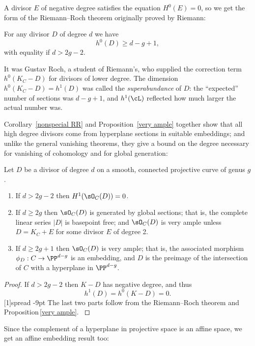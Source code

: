 A divisor $E$
of negative degree 
satisfies the equation
$H^0(E) = 0$,
so we get the form of the Riemann--Roch theorem
originally proved by 
Riemann:
%

\begin{corollary}\label{nonspecial RR}
For any divisor $D$ of degree $d$ we have
$$
h^0(D) \geq d - g + 1,
$$
with equality if $d > 2g-2$.
\end{corollary}
%
It was 
Gustav Roch,
%
a student of
Riemann's, 
who supplied the correction term $h^0(K_C - D)$ for divisors of lower degree.
The dimension $h^0(K_C-D) = h^1(D)$ was called the 
\emph{superabundance}
%
of $D$: the ``expected'' number of sections was $d-g+1$, and $h^1(\cL)$ reflected how much larger the actual number was.

Corollary~\ref{nonspecial RR} and Proposition~\ref{very ample} together show that all high degree divisors come from hyperplane sections in 
suitable embeddings; and unlike the general vanishing theorems, they give a bound on the degree necessary for vanishing
of cohomology and for
global generation:

\begin{corollary}\label{degree 2g+1 embedding}
Let $D$ be a divisor of degree $d$ on a smooth, connected projective curve of genus $g$.
\begin{enumerate}
 \item If $d>2g-2$ then $H^1(\sO_C(D)) = 0$.
 \item If $d \geq 2g$ then $\sO_C(D)$ is generated by global sections; that is, the complete linear series $|D|$ is basepoint free; and $\sO_C(D)$ is very ample unless $D = K_{C}+E$ for some divisor $E$ of degree 2.
 \item If $d \geq 2g+1$ then $\sO_C(D)$ is very ample; that is, the associated morphism $\phi_D : C \to \PP^{d-g}$ is an embedding, and
$D$ is the preimage of the intersection of $C$ with a hyperplane in $ \PP^{d-g}$.
\end{enumerate}
\end{corollary}

\begin{proof}
If $d>2g-2$ then $K-D$ has negative degree, and thus 
$$h^1(D) = h^0(K-D) = 0. $$ 
\scalebox{0.99}[1]{\hbox spread -9pt{%
The last two parts follow
from the Riemann--Roch theorem and Proposition\,\ref{very ample}.
\unskip}}
\end{proof}

Since the complement of a hyperplane in projective space is an affine space, we get an affine embedding result too:

